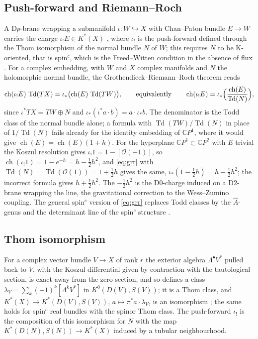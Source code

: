 \documentclass[reqno,11pt]{amsart}
\theoremstyle{definition}
\newcommand{\CC}{\mathbb{C}}
\newcommand{\ch}{\operatorname{ch}}
\newcommand{\Td}{\operatorname{Td}}
\newcommand{\Ahat}{\widehat{A}}
\begin{document}
\subsection{Push-forward and Riemann--Roch}
A D$p$-brane wrapping a submanifold $\iota\colon W\hookrightarrow X$ with Chan--Paton bundle $E\to W$ carries the charge $\iota_!E\in K^*(X)$ \cite{MM97,Wit98}, where $\iota_!$ is the push-forward defined through the Thom isomorphism of the normal bundle $N$ of $W$; this requires $N$ to be K-oriented, that is spin$^c$, which is the Freed--Witten condition in the absence of flux \cite{FW99}. For a complex embedding, with $W$ and $X$ complex manifolds and $N$ the holomorphic normal bundle, the Grothendieck--Riemann--Roch theorem reads
\begin{equation}\label{eq:grr}
\ch(\iota_!E)\,\Td(TX)=\iota_*\bigl(\ch(E)\,\Td(TW)\bigr),\qquad\text{equivalently}\qquad\ch(\iota_!E)=\iota_*\Bigl(\frac{\ch(E)}{\Td(N)}\Bigr),
\end{equation}
since $\iota^*TX=TW\oplus N$ and $\iota_*(\iota^*a\cdot b)=a\cdot\iota_*b$. The denominator is the Todd class of the normal bundle alone; a formula with $\Td(TW)/\Td(N)$ in place of $1/\Td(N)$ fails already for the identity embedding of $\CC P^1$, where it would give $\ch(E)=\ch(E)(1+h)$. For the hyperplane $\CC P^1\subset\CC P^2$ with $E$ trivial the Koszul resolution gives $\iota_!1=1-[\mathcal O(-1)]$, so $\ch(\iota_!1)=1-e^{-h}=h-\tfrac12h^2$, and \eqref{eq:grr} with $\Td(N)=\Td(\mathcal O(1))=1+\tfrac12h$ gives the same, $\iota_*(1-\tfrac12h)=h-\tfrac12h^2$; the incorrect formula gives $h+\tfrac12h^2$. The $-\tfrac12h^2$ is the D0-charge induced on a D2-brane wrapping the line, the gravitational correction to the Wess--Zumino coupling. The general spin$^c$ version of \eqref{eq:grr} replaces Todd classes by the $\Ahat$-genus and the determinant line of the spin$^c$ structure \cite{AS68}.

\subsection{Thom isomorphism}
For a complex vector bundle $V\to X$ of rank $r$ the exterior algebra $\Lambda^\bullet V^*$ pulled back to $V$, with the Koszul differential given by contraction with the tautological section, is exact away from the zero section, and so defines a class $\lambda_V=\sum_k(-1)^k[\Lambda^kV^*]$ in $K^0(D(V),S(V))$; it is a Thom class, and $K^*(X)\to K^*(D(V),S(V))$, $a\mapsto\pi^*a\cdot\lambda_V$, is an isomorphism \cite{Ati67}; the same holds for spin$^c$ real bundles with the spinor Thom class. The push-forward $\iota_!$ is the composition of this isomorphism for $N$ with the map $K^*(D(N),S(N))\to K^*(X)$ induced by a tubular neighbourhood.
\end{document}
